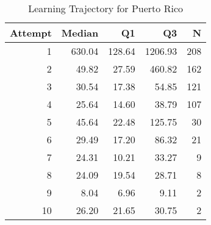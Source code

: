 \begin{table}[htbp]
\centering
\caption{Learning Trajectory for Puerto Rico}
\label{tab:learning-trajectory}
\begin{tabular}{rrrrr}
\toprule
Attempt & Median & Q1 & Q3 & N \\
\midrule
1 & 630.04 & 128.64 & 1206.93 & 208 \\
2 & 49.82 & 27.59 & 460.82 & 162 \\
3 & 30.54 & 17.38 & 54.85 & 121 \\
4 & 25.64 & 14.60 & 38.79 & 107 \\
5 & 45.64 & 22.48 & 125.75 & 30 \\
6 & 29.49 & 17.20 & 86.32 & 21 \\
7 & 24.31 & 10.21 & 33.27 & 9 \\
8 & 24.09 & 19.54 & 28.71 & 8 \\
9 & 8.04 & 6.96 & 9.11 & 2 \\
10 & 26.20 & 21.65 & 30.75 & 2 \\
\bottomrule
\end{tabular}
\end{table}